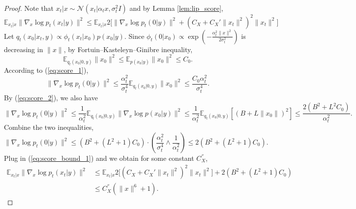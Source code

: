 \documentclass{article}
\numberwithin{equation}{section}
\def\eqref#1{equation~\ref{#1}}
\newcommand{\E}{\mathbb{E}}
\theoremstyle{definition}
\renewcommand{\eqref}[1]{(\ref{#1})}
\begin{document}
\begin{proof}
    Note that $x_t|x\sim \mathcal{N}(x_t|\alpha_tx,\sigma_t^2I)$ and by Lemma \ref{lem:lip_score},
    \begin{equation}\label{eq:score_bound_1}
        \E_{x_t|x}\|\nabla_x\log p_t(x_t|y)\|^2
        \leq \E_{x_t|x} 2\Big[\|\nabla_x\log p_t(0|y)\|^2+(C_X+C_X'\|x_t\|^2)^2\|x_t\|^2\Big]
    \end{equation}
    Let $q_t(x_0|x_t,y)\propto \phi_t(x_t|x_0)p(x_0|y)$.
    Since $\phi_t(0|x_0)\propto \exp\left(-\frac{\alpha_t^2\|x\|^2}{2\sigma_t^2}\right)$ is decreasing in $\|x\|$, by Fortuin–Kasteleyn–Ginibre inequality,
    \begin{equation}
        \E_{q_t(x_0|0,y)}\|x_0\|^2\leq \E_{p(x_0|y)}\|x_0\|^2\leq C_0.
    \end{equation}
    According to \eqref{eq:score_1},
    \begin{equation}
        \|\nabla_x\log p_t(0|y)\|^2
        \leq \frac{\alpha_t^2}{\sigma_t^4}\E_{q_t(x_0|0,y)}\|x_0\|^2\leq \frac{C_0\alpha_t^2}{\sigma_t^4}.
    \end{equation}
    By \eqref{eq:score_2}, we also have
    \begin{equation}
        \|\nabla_x\log p_t(0|y)\|^2
        \leq \frac{1}{\alpha_t^2}\E_{q_t(x_0|0,y)}\|\nabla_x\log p(x_0|y)\|^2\leq \frac{1}{\alpha_t^2}\E_{q_t(x_0|0,y)}[(B+L\|x_0\|)^2]\leq \frac{2(B^2+L^2C_0)}{\alpha_t^2}.
    \end{equation}
    Combine the two inequalities,
    \begin{equation}
        \|\nabla_x\log p_t(0|y)\|^2\leq (B^2+(L^2+1)C_0)\cdot(\frac{\alpha_t^2}{\sigma_t^4}\wedge\frac{1}{\alpha_t^2})\leq 2(B^2+(L^2+1)C_0).
    \end{equation}
    Plug in \eqref{eq:score_bound_1} and we obtain for some constant $C_X^{''}$,
    \begin{equation}
        \begin{aligned}
        \E_{x_t|x}\|\nabla_x\log p_t(x_t|y)\|^2
        &\leq \E_{x_t|x} 2\Big[(C_X+C_X'\|x_t\|^2)^2\|x_t\|^2\Big] + 2(B^2+(L^2+1)C_0) \\
        &\leq C_X^{''}(\|x\|^6+1).
        \end{aligned}
    \end{equation}
\end{proof}
\end{document}
